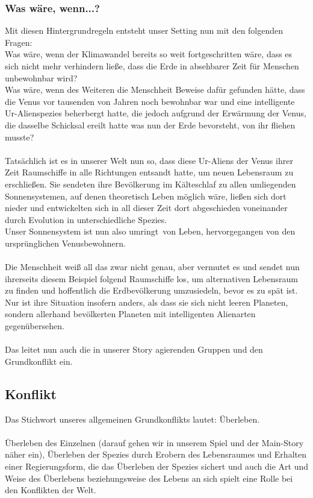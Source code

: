 \documentclass[12pt]{article}
\begin{document}
	\subsubsection{Was wäre, wenn...?}
	Mit diesen Hintergrundregeln entsteht unser Setting nun mit den folgenden Fragen:\\
	Was wäre, wenn der Klimawandel bereits so weit fortgeschritten wäre, dass es sich nicht mehr verhindern ließe,
	dass die Erde in absehbarer Zeit für Menschen unbewohnbar wird?\\
	Was wäre, wenn des Weiteren die Menschheit Beweise dafür gefunden hätte, dass die Venus vor tausenden von
	Jahren noch bewohnbar war und eine intelligente Ur-Alienspezies beherbergt hatte, die jedoch aufgrund der
	Erwärmung der Venus, die dasselbe Schicksal ereilt hatte was nun der Erde bevorsteht, von ihr fliehen musste?\\
	\\
	Tatsächlich ist es in unserer Welt nun so, dass diese Ur-Aliens der Venus ihrer Zeit Raumschiffe in alle Richtungen entsandt hatte, um neuen Lebensraum zu erschließen. Sie sendeten ihre Bevölkerung im Kälteschlaf zu allen umliegenden Sonnensystemen, auf denen theoretisch Leben möglich wäre, ließen sich dort nieder und entwickelten sich in all dieser Zeit dort abgeschieden voneinander durch Evolution in unterschiedliche Spezies.\\
	Unser Sonnensystem ist nun also \glqq umringt\grqq\ von Leben, hervorgegangen von den ursprünglichen Venusbewohnern.\\
	\\
	Die Menschheit weiß all das zwar nicht genau, aber vermutet es und sendet nun ihrerseits diesem Beispiel
	folgend Raumschiffe los, um alternativen Lebensraum zu finden und hoffentlich die Erdbevölkerung umzusiedeln,
	bevor es zu spät ist.\\
	Nur ist ihre Situation insofern anders, als dass sie sich nicht leeren Planeten, sondern allerhand bevölkerten
	Planeten mit intelligenten Alienarten gegenübersehen.\\
	\\
	Das leitet nun auch die in unserer Story agierenden Gruppen und den Grundkonflikt ein.
	
	
	\subsection{Konflikt}
	Das Stichwort unseres allgemeinen Grundkonflikts lautet: Überleben.\\
	\\
	Überleben des Einzelnen (darauf gehen wir in unserem Spiel und der Main-Story näher ein), Überleben der Spezies durch Erobern des Lebensraumes und Erhalten einer Regierungsform, die das Überleben der Spezies sichert und auch die Art und Weise des Überlebens beziehungsweise des Lebens an sich spielt eine Rolle bei den Konflikten der Welt.
	
\end{document}
